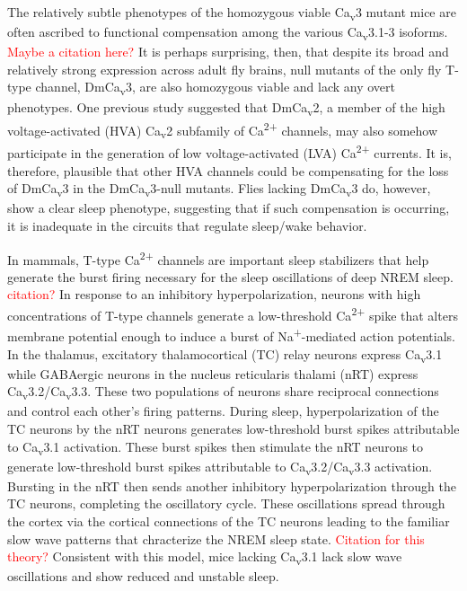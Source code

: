 The relatively subtle phenotypes of the homozygous viable Ca\textsubscript{v}3 mutant mice are often ascribed to functional compensation among the various Ca\textsubscript{v}3.1-3 isoforms. \textcolor{red}{Maybe a citation here?}
It is perhaps surprising, then, that despite its broad and relatively strong expression across adult fly brains, null mutants of the only fly T-type channel, DmCa\textsubscript{v}3, are also homozygous viable and lack any overt phenotypes.
One previous study suggested that DmCa\textsubscript{v}2, a member of the high voltage-activated (HVA) Ca\textsubscript{v}2 subfamily of Ca\textsuperscript{2+} channels, may also somehow participate in the generation of low voltage-activated (LVA) Ca\textsuperscript{2+} currents\cite{Ryglewski:2012jk}.
It is, therefore, plausible that other HVA channels could be compensating for the loss of DmCa\textsubscript{v}3 in the DmCa\textsubscript{v}3-null mutants. Flies lacking DmCa\textsubscript{v}3 do, however, show a clear sleep phenotype, suggesting that if such compensation is occurring, it is inadequate in the circuits that regulate sleep/wake behavior.

In mammals, T-type Ca\textsuperscript{2+} channels are important sleep stabilizers that help generate the burst firing necessary for the sleep oscillations of deep NREM sleep. \textcolor{red}{citation?}
In response to an inhibitory hyperpolarization, neurons with high concentrations of T-type channels generate a low-threshold Ca\textsuperscript{2+} spike that alters membrane potential enough to induce a burst of Na\textsuperscript{+}-mediated action potentials.
In the thalamus, excitatory thalamocortical (TC) relay neurons express Ca\textsubscript{v}3.1 while GABAergic neurons in the nucleus reticularis thalami (nRT) express Ca\textsubscript{v}3.2/Ca\textsubscript{v}3.3.
These two populations of neurons share reciprocal connections and control each other's firing patterns.
During sleep, hyperpolarization of the TC neurons by the nRT neurons generates low-threshold burst spikes attributable to Ca\textsubscript{v}3.1 activation.
These burst spikes then stimulate the nRT neurons to generate low-threshold burst spikes attributable to Ca\textsubscript{v}3.2/Ca\textsubscript{v}3.3 activation.
Bursting in the nRT then sends another inhibitory hyperpolarization through the TC neurons, completing the oscillatory cycle.
These oscillations spread through the cortex via the cortical connections of the TC neurons leading to the familiar slow wave patterns that chracterize the NREM sleep state. \textcolor{red}{Citation for this theory?}
Consistent with this model, mice lacking Ca\textsubscript{v}3.1 lack slow wave oscillations and show reduced and unstable sleep\cite{Lee:2004ey}.

